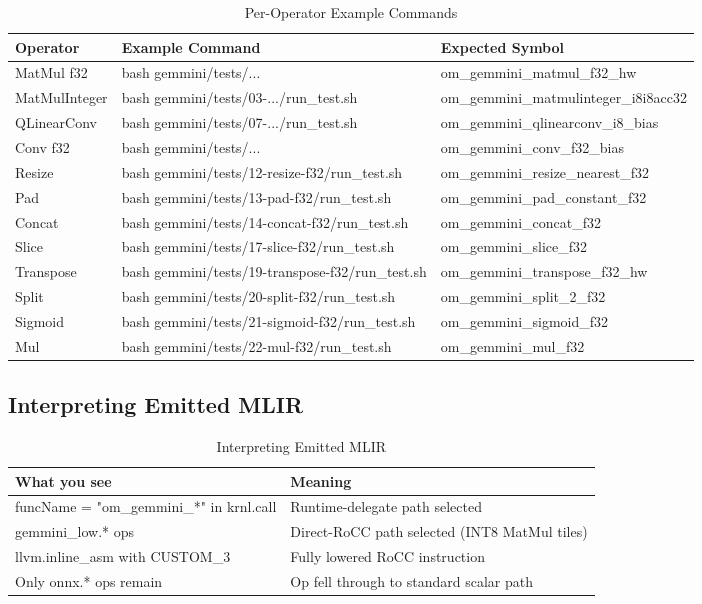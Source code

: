 \documentclass[12pt,a4paper]{article}
\begin{document}
\begin{table}[H]
\centering
\begin{tabular}{|p{}|p{}|p{}|}
\hline
\textbf{Operator} & \textbf{Example Command} & \textbf{Expected Symbol} \\
\hline
MatMul f32 & bash gemmini/tests/... & om\_gemmini\_matmul\_f32\_hw \\
\hline
MatMulInteger & bash gemmini/tests/03-.../run\_test.sh & om\_gemmini\_matmulinteger\_i8i8acc32 \\
\hline
QLinearConv & bash gemmini/tests/07-.../run\_test.sh & om\_gemmini\_qlinearconv\_i8\_bias \\
\hline
Conv f32 & bash gemmini/tests/... & om\_gemmini\_conv\_f32\_bias \\
\hline
Resize & bash gemmini/tests/12-resize-f32/run\_test.sh & om\_gemmini\_resize\_nearest\_f32 \\
\hline
Pad & bash gemmini/tests/13-pad-f32/run\_test.sh & om\_gemmini\_pad\_constant\_f32 \\
\hline
Concat & bash gemmini/tests/14-concat-f32/run\_test.sh & om\_gemmini\_concat\_f32 \\
\hline
Slice & bash gemmini/tests/17-slice-f32/run\_test.sh & om\_gemmini\_slice\_f32 \\
\hline
Transpose & bash gemmini/tests/19-transpose-f32/run\_test.sh & om\_gemmini\_transpose\_f32\_hw \\
\hline
Split & bash gemmini/tests/20-split-f32/run\_test.sh & om\_gemmini\_split\_2\_f32 \\
\hline
Sigmoid & bash gemmini/tests/21-sigmoid-f32/run\_test.sh & om\_gemmini\_sigmoid\_f32 \\
\hline
Mul & bash gemmini/tests/22-mul-f32/run\_test.sh & om\_gemmini\_mul\_f32 \\
\hline
\end{tabular}
\caption{Per-Operator Example Commands}
\end{table}

\subsection{Interpreting Emitted MLIR}

\begin{table}[H]
\centering
\begin{tabular}{|p{}|p{}|}
\hline
\textbf{What you see} & \textbf{Meaning} \\
\hline
funcName = "om\_gemmini\_*" in krnl.call & Runtime-delegate path selected \\
\hline
gemmini\_low.* ops & Direct-RoCC path selected (INT8 MatMul tiles) \\
\hline
llvm.inline\_asm with CUSTOM\_3 & Fully lowered RoCC instruction \\
\hline
Only onnx.* ops remain & Op fell through to standard scalar path \\
\hline
\end{tabular}
\caption{Interpreting Emitted MLIR}
\end{table}
\end{document}
